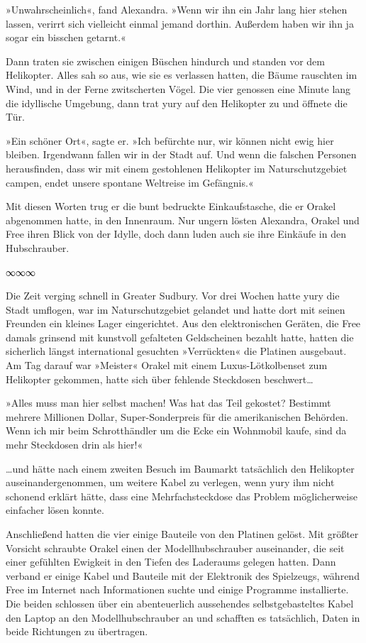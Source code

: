 »Unwahrscheinlich«, fand Alexandra. »Wenn wir ihn ein Jahr lang hier stehen lassen, verirrt sich vielleicht einmal jemand dorthin. Außerdem haben wir ihn ja sogar ein bisschen getarnt.«

Dann traten sie zwischen einigen Büschen hindurch und standen vor dem Helikopter. Alles sah so aus, wie sie es verlassen hatten, die Bäume rauschten im Wind, und in der Ferne zwitscherten Vögel. Die vier genossen eine Minute lang die idyllische Umgebung, dann trat yury auf den Helikopter zu und öffnete die Tür.

»Ein schöner Ort«, sagte er. »Ich befürchte nur, wir können nicht ewig hier bleiben. Irgendwann fallen wir in der Stadt auf. Und wenn die falschen Personen herausfinden, dass wir mit einem gestohlenen Helikopter im Naturschutzgebiet campen, endet unsere spontane Weltreise im Gefängnis.«

Mit diesen Worten trug er die bunt bedruckte Einkaufstasche, die er Orakel abgenommen hatte, in den Innenraum. Nur ungern lösten Alexandra, Orakel und Free ihren Blick von der Idylle, doch dann luden auch sie ihre Einkäufe in den Hubschrauber.

\begin{center}
    ∞∞∞
\end{center}

Die Zeit verging schnell in Greater Sudbury. Vor drei Wochen hatte yury die Stadt umflogen, war im Naturschutzgebiet gelandet und hatte dort mit seinen Freunden ein kleines Lager eingerichtet. Aus den elektronischen Geräten, die Free damals grinsend mit kunstvoll gefalteten Geldscheinen bezahlt hatte, hatten die sicherlich längst international gesuchten »Verrückten« die Platinen ausgebaut. Am Tag darauf war »Meister« Orakel mit einem Luxus-Lötkolbenset zum Helikopter gekommen, hatte sich über fehlende Steckdosen beschwert…

»Alles muss man hier selbst machen! Was hat das Teil gekostet? Bestimmt mehrere Millionen Dollar, Super-Sonderpreis für die amerikanischen Behörden. Wenn ich mir beim Schrotthändler um die Ecke ein Wohnmobil kaufe, sind da mehr Steckdosen drin als hier!«

…und hätte nach einem zweiten Besuch im Baumarkt tatsächlich den Helikopter auseinandergenommen, um weitere Kabel zu verlegen, wenn yury ihm nicht schonend erklärt hätte, dass eine Mehrfachsteckdose das Problem möglicherweise einfacher lösen konnte.

Anschließend hatten die vier einige Bauteile von den Platinen gelöst. Mit größter Vorsicht schraubte Orakel einen der Modellhubschrauber auseinander, die seit einer gefühlten Ewigkeit in den Tiefen des Laderaums gelegen hatten. Dann verband er einige Kabel und Bauteile mit der Elektronik des Spielzeugs, während Free im Internet nach Informationen suchte und einige Programme installierte. Die beiden schlossen über ein abenteuerlich aussehendes selbstgebasteltes Kabel den Laptop an den Modellhubschrauber an und schafften es tatsächlich, Daten in beide Richtungen zu übertragen.

